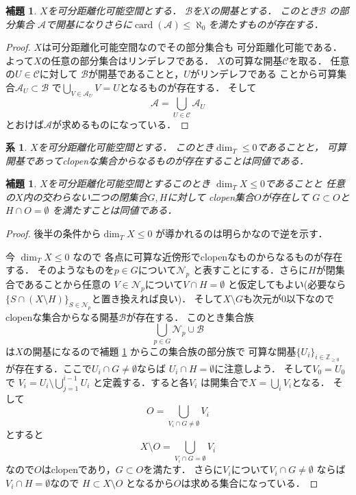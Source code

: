 \documentclass[leqno, a4paper, 12pt]{jsarticle}
\newtheorem{cor}[thm]{系}
\newtheorem{lem}[thm]{補題}
\newcommand{\zz}{\mathbb{Z}}
\DeclareMathOperator{\card}{card}
\numberwithin{equation}{section}
\begin{document}
\begin{lem}\label{lem:toridashi}
$X$を可分距離化可能空間とする．
$\mathcal{B}$を$X$の開基とする．
このとき$\mathcal{B}$
の部分集合
$\mathcal{A}$で開基になりさらに$\card(\mathcal{A})\le \aleph_{0}$を満たすものが存在する．
\end{lem}
\begin{proof}
$X$は可分距離化可能空間なのでその部分集合も
可分距離化可能である．
よって$X$の任意の部分集合はリンデレフである．
$X$の可算な開基$\mathcal{C}$を取る．
任意の$U\in \mathcal{C}$に対して
$\mathcal{B}$が開基であることと，$U$がリンデレフである
ことから可算集合$\mathcal{A}_{U}\subset \mathcal{B}$
で$\bigcup_{V\in  \mathcal{A}_{U}}V=U$となるものが存在する．
そして
\[
\mathcal{A}=\bigcup_{U\in \mathcal{C}}\mathcal{A}_{U}
\]
とおけば$\mathcal{A}$が求めるものになっている．
\end{proof}


\begin{cor}
$X$を可分距離化可能空間とする．
このとき$\dim_{T}\le 0$であることと，
可算開基であってclopenな集合からなるものが存在することは同値である．
\end{cor}

\begin{lem}\label{lem:ultranormal}
$X$を可分距離化可能空間とするこのとき
$\dim_{T}X\le 0$であることと
任意の$X$内の交わらない二つの閉集合$G, H$に対して
clopen集合$O$が存在して
$G\subset O$と$H\cap O=\emptyset$
を満たすことは同値である．
\end{lem}
\begin{proof}
後半の条件から$\dim_{T} X\le 0$
が導かれるのは明らかなので逆を示す．

今
$\dim_{T}X\le 0$
なので
各点に可算な近傍形でclopenなものからなるものが存在する．
そのようなものを$p\in G$について$\mathcal{N}_{p}$
と表すことにする．さらに$H$が閉集合であることから任意の
$V\in \mathcal{N}_{p}$について$V\cap H=\emptyset$
と仮定してもよい(必要なら$\{S\cap (X\setminus H)\}_{S\in \mathcal{N}_{p}}$と置き換えれば良い)．
そして$X\setminus G$も次元が$0$以下なので
clopenな集合からなる開基$\mathcal{B}$が存在する．
このとき集合族
\[
\bigcup_{p\in G}\mathcal{N}_{p}\cup \mathcal{B}
\]
は$X$の開基になるので補題 \ref{lem:toridashi}
からこの集合族の部分族で
可算な開基$\{U_{i}\}_{i\in \zz_{\ge 0}}$
が存在する．ここで$U_{i}\cap G\neq \emptyset$ならば
$U_{i}\cap H=\emptyset$に注意しよう．
そして$V_{0}=U_{0}$で
$V_{i}=U_{i}\setminus \bigcup_{j=1}^{i-1}U_{i}$
と定義する．すると各$V_{i}$
は開集合で$X=\bigcup_{i}V_{i}$となる．
そして
\[
O=\bigcup_{V_{i}\cap G\neq \emptyset}V_{i}
\]
とすると
\[
X\setminus O=\bigcup_{V_{i}\cap G= \emptyset}V_{i}
\]
なので$O$はclopenであり，$G\subset O$を満たす．
さらに$V_{i}$について$V_{i}\cap G\neq \emptyset$
ならば$V_{i}\cap H=\emptyset$なので
$H\subset X\setminus O$
となるから$O$は求める集合になっている．
\end{proof}
\end{document}
